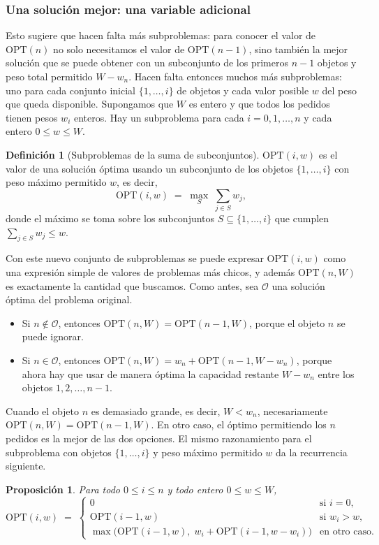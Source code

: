 \documentclass[12pt, spanish, oneside, openany]{book}
\theoremstyle{uprightplain}
\newtheorem{proposicion}[teorema]{Proposición}
\theoremstyle{definition}
\newtheorem{definicion}[teorema]{Definición}
\theoremstyle{remark}
\theoremstyle{definition}
\newcommand{\OPT}{\mathrm{OPT}} %
\begin{document}
\subsubsection{Una solución mejor: una variable adicional}

Esto sugiere que hacen falta más subproblemas: para conocer el valor de $\OPT(n)$ no solo necesitamos el valor de $\OPT(n-1)$, sino también la mejor solución que se puede obtener con un subconjunto de los primeros $n-1$ objetos y peso total permitido $W-w_n$. Hacen falta entonces muchos más subproblemas: uno para cada conjunto inicial $\{1,\dots,i\}$ de objetos y cada valor posible $w$ del peso que queda disponible. Supongamos que $W$ es entero y que todos los pedidos tienen pesos $w_i$ enteros. Hay un subproblema para cada $i=0,1,\dots,n$ y cada entero $0\le w\le W$.

\begin{definicion}[Subproblemas de la suma de subconjuntos]
\label{def:dp-opt-subset-sum}
$\OPT(i,w)$ es el valor de una solución óptima usando un subconjunto de los objetos $\{1,\dots,i\}$ con peso máximo permitido $w$, es decir,
\[
\OPT(i,w) \;=\; \max_{S}\;\sum_{j\in S} w_j ,
\]
donde el máximo se toma sobre los subconjuntos $S\subseteq\{1,\dots,i\}$ que cumplen $\sum_{j\in S}w_j\le w$.
\end{definicion}

Con este nuevo conjunto de subproblemas se puede expresar $\OPT(i,w)$ como una expresión simple de valores de problemas más chicos, y además $\OPT(n,W)$ es exactamente la cantidad que buscamos. Como antes, sea $\mathcal{O}$ una solución óptima del problema original.
\begin{itemize}
    \item Si $n\notin\mathcal{O}$, entonces $\OPT(n,W)=\OPT(n-1,W)$, porque el objeto $n$ se puede ignorar.
    \item Si $n\in\mathcal{O}$, entonces $\OPT(n,W)=w_n+\OPT(n-1,W-w_n)$, porque ahora hay que usar de manera óptima la capacidad restante $W-w_n$ entre los objetos $1,2,\dots,n-1$.
\end{itemize}
Cuando el objeto $n$ es demasiado grande, es decir, $W<w_n$, necesariamente $\OPT(n,W)=\OPT(n-1,W)$. En otro caso, el óptimo permitiendo los $n$ pedidos es la mejor de las dos opciones. El mismo razonamiento para el subproblema con objetos $\{1,\dots,i\}$ y peso máximo permitido $w$ da la recurrencia siguiente.

\begin{proposicion}
\label{prop:dp-subset-sum}
Para todo $0\le i\le n$ y todo entero $0\le w\le W$,
\begin{equation}
\label{eq:dp-subset-sum}
\OPT(i,w) \;=\;
\begin{cases}
0 & \text{si } i=0,\\[2pt]
\OPT(i-1,w) & \text{si } w_i>w,\\[2pt]
\max\bigl(\OPT(i-1,w),\; w_i+\OPT(i-1,w-w_i)\bigr) & \text{en otro caso.}
\end{cases}
\end{equation}
\end{proposicion}
\end{document}
